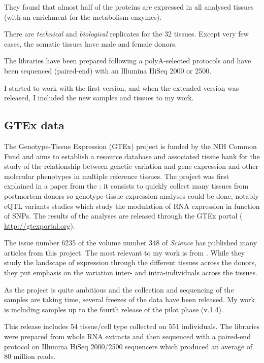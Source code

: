 They found that almost half of the proteins are expressed in all analysed tissues
(with an enrichment for the metabolism enzymes).

There are \emph{technical} and \emph{biological} replicates for the 32 tissues.
Except very few cases, the somatic tissues have male and female donors.

The libraries have been prepared following a polyA-selected protocols and have
been sequenced (paired-end) with an Illumina HiSeq 2000 or 2500.

I started to work with the first version, and when the extended version was
released, I included the new samples and tissues to my work.

\subsection{GTEx data}

The Genotype-Tissue Expression (\gls{GTEx}) project is funded by the NIH Common
Fund and aims to establish a resource database and associated tissue bank
for the study of the relationship between genetic variation and gene expression
and other molecular phenotypes in multiple reference tissues. The project was first
explained in a paper from the \cite{GTEx2013}: it consists to quickly collect
many tissues from postmortem donors so genotype-tissue expression analyses could
be done, notably \gls{eQTL} variants studies which study the modulation
of \gls{RNA} expression in function of \glspl{SNP}. The results of the
analyses are released through the GTEx portal (%
\href{http://gtexportal.org}{http://gtexportal.org}).

The issue number 6235 of the volume number 348 of \emph{Science} has published
many articles from this project. The most relevant to my work is
 from \cite{GTExTranscript}. While they study
the landscape of expression through the different tissues across the donors, they
put emphasis on the variation inter- and intra-individuals across the tissues.

As the project is quite ambitious and the collection and sequencing of the samples
are taking time, several freezes of the data have been released. My work is
including samples up to the fourth release of the pilot phase (v.1.4).

This release includes 54 tissue/cell type collected on 551 individuals.
The libraries were prepared from whole \gls{RNA} extracts and then sequenced
with a paired-end protocol on Illumina HiSeq 2000/2500 sequencers which produced
an average of 80 million reads.

